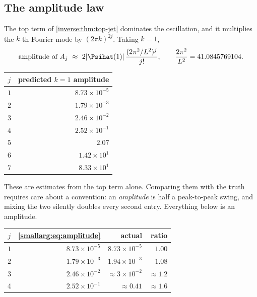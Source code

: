 \documentclass[11pt,oneside]{article}
\theoremstyle{definition}
\theoremstyle{remark}
\begin{document}
\subsection{The amplitude law}

The top term of \cref{inverse:thm:top-jet} dominates the oscillation, and it multiplies
the $k$-th Fourier mode by $(2\pi k)^{2j}$.  Taking $k=1$,
\begin{equation}\label{smallarg:eq:amplitude}
  \text{amplitude of }A_j\ \approx\
  2|\Psihat(1)|\,\frac{(2\pi^2/L^2)^j}{j!},
  \qquad \frac{2\pi^2}{L^2}=41.0845769104 .
\end{equation}

\begin{center}
\begin{tabular}{@{}cr@{}}
\toprule
$j$ & predicted $k=1$ amplitude\\
\midrule
$1$ & $8.73\times10^{-5}$\\
$2$ & $1.79\times10^{-3}$\\
$3$ & $2.46\times10^{-2}$\\
$4$ & $2.52\times10^{-1}$\\
$5$ & $2.07$\\
$6$ & $1.42\times10^{1}$\\
$7$ & $8.33\times10^{1}$\\
\bottomrule
\end{tabular}
\end{center}

These are estimates from the top term alone.  Comparing them with the truth
requires care about a convention: an \emph{amplitude} is half a
peak-to-peak swing, and mixing the two silently doubles every second
entry.  Everything below is an amplitude.

\begin{center}
\begin{tabular}{@{}crrr@{}}
\toprule
$j$ & \cref{smallarg:eq:amplitude} & actual & ratio\\
\midrule
$1$ & $8.73\times10^{-5}$ & $8.73\times10^{-5}$ & $1.00$\\
$2$ & $1.79\times10^{-3}$ & $1.94\times10^{-3}$ & $1.08$\\
$3$ & $2.46\times10^{-2}$ & $\approx3\times10^{-2}$ & $\approx1.2$\\
$4$ & $2.52\times10^{-1}$ & $\approx0.41$ & $\approx1.6$\\
\bottomrule
\end{tabular}
\end{center}
\end{document}
